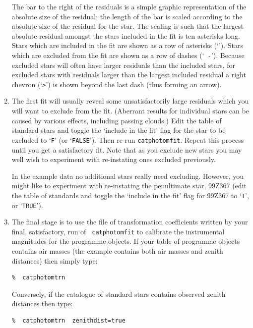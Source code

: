 \documentclass[twoside,11pt]{article}
\begin{document}
\begin{enumerate}
   The bar to the right of the residuals is a simple graphic
   representation of the absolute size of the residual; the length of the
   bar is scaled according to the absolute size of the residual for the
   star.  The scaling is such that the largest absolute residual amongst
   the stars included in the fit is ten asterisks long.  Stars which are
   included in the fit are shown as a row of asterisks (`{\tt *}').  Stars
   which are excluded from the fit are shown as a row of dashes (`{\tt
   -}').  Because excluded stars will often have larger residuals than the
   included stars, for excluded stars with residuals larger than the
   largest included residual a right chevron (`\verb->-') is shown beyond
   the last dash (thus forming an arrow).

  \item The first fit will usually reveal some unsatisfactorily large
   residuals which you will want to exclude from the fit.  (Aberrant
   results for individual stars can be caused by various effects, including
   passing clouds.)  Edit the table of standard stars and toggle the
   `include in the fit' flag for the star to be excluded to `{\tt F}' 
   (or `{\tt FALSE}').  Then re-run {\tt catphotomfit}.  Repeat this
   process until you get a satisfactory fit.  Note that as you exclude
   new stars you may well wish to experiment with re-instating ones
   excluded previously.

   In the example data no additional stars really need excluding.
   However, you might like to experiment with re-instating the
   penultimate star, 99Z367 (edit the table of standards and toggle the
   `include in the fit' flag for 99Z367 to `{\tt T}', or `{\tt TRUE}').

  \item The final stage is to use the file of transformation
   coefficients written by your final, satisfactory, run of {\tt
   catphotomfit} to calibrate the instrumental magnitudes for the
   programme objects.  If your table of programme objects contains air
   masses (the example contains both air masses and zenith distances)
   then simply type:

\begin{verbatim}
%  catphotomtrn
\end{verbatim}

   Conversely, if the catalogue of standard stars contains observed
   zenith distances then type:

\begin{verbatim}
%  catphotomtrn  zenithdist=true
\end{verbatim}


\end{enumerate}
\end{document}
